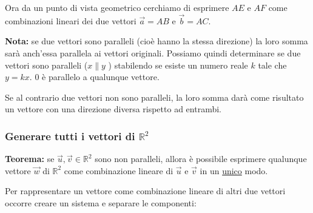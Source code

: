 \documentclass[../main.tex]{subfiles}
\begin{document}
Ora da un punto di vista geometrico cerchiamo di esprimere $AE$ e $AF$ come combinazioni lineari dei due vettori $\vec{a}=AB$ e $\vec{b}=AC$.
\begin{center}
\end{center}

\textbf{Nota:} se due vettori sono paralleli (cioè hanno la stessa direzione) la loro somma sarà anch'essa parallela ai vettori originali. Possiamo quindi determinare
se due vettori sono paralleli ($x \parallel y$ ) stabilendo se esiste un numero reale $k$ tale che $y=kx$. 0 è parallelo a qualunque vettore.

Se al contrario due vettori non sono paralleli, la loro somma darà come risultato un vettore con una direzione diversa rispetto ad entrambi.

\subsubsection{Generare tutti i vettori di $\mathbb{R}^2$}
\textbf{Teorema:} se $\vec{u},\vec{v} \in \mathbb{R}^2$ sono non paralleli, allora è possibile esprimere qualunque vettore $\vec{w}$ di $\mathbb{R}^2$ come combinazione lineare di $\vec{u}$ e $\vec{v}$ in un \underline{unico} modo.

Per rappresentare un vettore come combinazione lineare di altri due vettori occorre creare un sistema e separare le componenti:
\end{document}
